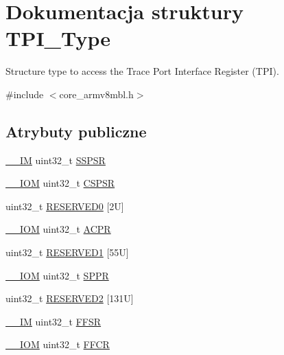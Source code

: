 \hypertarget{struct_t_p_i___type}{}\section{Dokumentacja struktury T\+P\+I\+\_\+\+Type}
\label{struct_t_p_i___type}


Structure type to access the Trace Port Interface Register (T\+PI).  




{\ttfamily \#include $<$core\+\_\+armv8mbl.\+h$>$}

\subsection*{Atrybuty publiczne}
\begin{DoxyCompactItemize}
\item 
\hyperlink{core__sc300_8h_a4cc1649793116d7c2d8afce7a4ffce43}{\+\_\+\+\_\+\+IM} uint32\+\_\+t \hyperlink{struct_t_p_i___type_a037901d7cb870199ac51d9ad0ef9fd1a}{S\+S\+P\+SR}
\item 
\hyperlink{core__sc300_8h_ab6caba5853a60a17e8e04499b52bf691}{\+\_\+\+\_\+\+I\+OM} uint32\+\_\+t \hyperlink{struct_t_p_i___type_a8826aa84e5806053395a742d38d59d0f}{C\+S\+P\+SR}
\item 
uint32\+\_\+t \hyperlink{struct_t_p_i___type_a409fb08ad6d58c17fcb7f59d65db6f93}{R\+E\+S\+E\+R\+V\+E\+D0} \mbox{[}2\+U\mbox{]}
\item 
\hyperlink{core__sc300_8h_ab6caba5853a60a17e8e04499b52bf691}{\+\_\+\+\_\+\+I\+OM} uint32\+\_\+t \hyperlink{struct_t_p_i___type_a9e5e4421ef9c3d5b7ff8b24abd4e99b3}{A\+C\+PR}
\item 
uint32\+\_\+t \hyperlink{struct_t_p_i___type_abc2f542560b78ccbbf0a44aadb5651fb}{R\+E\+S\+E\+R\+V\+E\+D1} \mbox{[}55\+U\mbox{]}
\item 
\hyperlink{core__sc300_8h_ab6caba5853a60a17e8e04499b52bf691}{\+\_\+\+\_\+\+I\+OM} uint32\+\_\+t \hyperlink{struct_t_p_i___type_a12f79d4e3ddc69893ba8bff890d04cc5}{S\+P\+PR}
\item 
uint32\+\_\+t \hyperlink{struct_t_p_i___type_ae6a238467f129df7440d97de8b58fe03}{R\+E\+S\+E\+R\+V\+E\+D2} \mbox{[}131\+U\mbox{]}
\item 
\hyperlink{core__sc300_8h_a4cc1649793116d7c2d8afce7a4ffce43}{\+\_\+\+\_\+\+IM} uint32\+\_\+t \hyperlink{struct_t_p_i___type_a6c47a0b4c7ffc66093ef993d36bb441c}{F\+F\+SR}
\item 
\hyperlink{core__sc300_8h_ab6caba5853a60a17e8e04499b52bf691}{\+\_\+\+\_\+\+I\+OM} uint32\+\_\+t \hyperlink{struct_t_p_i___type_a3f68b6e73561b4849ebf953a894df8d2}{F\+F\+CR}

\end{DoxyCompactItemize}

